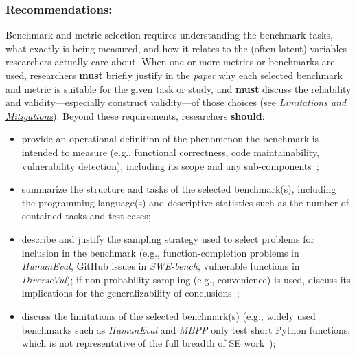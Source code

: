 \documentclass[smallextended]{svjour3}
\newcommand{\must}{\textbf{must}\xspace}
\newcommand{\should}{\textbf{should}\xspace}
\newcommand{\paper}{\emph{paper}\xspace}
\newcommand{\paper}{\emph{paper}\xspace}
\newcommand{\limitationsmitigations}{\hyperref[sec:report-limitations-and-mitigations]{\emph{Limitations and Mitigations}}\xspace}
\newcommand{\limitationsmitigations}{\href{/guidelines/limitations/}{\emph{Limitations and Mitigations}}\xspace}
\newcommand{\guidelinesubsubsection}[1]{\subsubsection{\bfseries #1:}}
\newcommand{\guidelinesubsubsection}[1]{\subsubsection{#1}}
\begin{document}
\guidelinesubsubsection{Recommendations}

Benchmark and metric selection requires understanding the benchmark tasks, what exactly is being measured, and how it relates to the (often latent) variables researchers actually care about. When one or more metrics or benchmarks are used, researchers \must briefly justify in the \paper why each selected benchmark and metric is suitable for the given task or study, and \must discuss the reliability and validity---especially construct validity---of those choices (see \limitationsmitigations). Beyond these requirements, researchers \should:
\begin{itemize}
    \item provide an operational definition of the phenomenon the benchmark is intended to measure (e.g., functional correctness, code maintainability, vulnerability detection), including its scope and any sub-components~\cite{bean2025measuring};
    \item summarize the structure and tasks of the selected benchmark(s), including the programming language(s) and descriptive statistics such as the number of contained tasks and test cases;
    \item describe and justify the sampling strategy used to select problems for inclusion in the benchmark (e.g., function-completion problems in \emph{HumanEval}, GitHub issues in \emph{SWE-bench}, vulnerable functions in \emph{DiverseVul}); if non-probability sampling (e.g., convenience) is used, discuss its implications for the generalizability of conclusions~\cite{DBLP:journals/ese/BaltesR22, bean2025measuring};
    \item discuss the limitations of the selected benchmark(s) (e.g., widely used benchmarks such as \emph{HumanEval} \cite{DBLP:journals/corr/abs-2107-03374} and \emph{MBPP} \cite{DBLP:journals/corr/abs-2108-07732} only test short Python functions, which is not representative of the full breadth of SE work~\cite{Chandra2025benchmarks, Izadi2026benchmarking});

\end{itemize}
\end{document}
